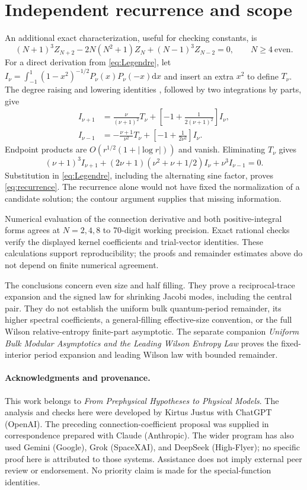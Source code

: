 \documentclass[10pt]{article}
\newcommand{\dd}{\mathrm d}
\begin{document}
\section{Independent recurrence and scope}
An additional exact characterization, useful for checking constants,
is
\begin{equation}
(N+1)^3Z_{N+2}-2N(N^2+1)Z_N+(N-1)^3Z_{N-2}=0,
\qquad N\ge4\ \text{even}.
\label{eq:recurrence}
\end{equation}
For a direct derivation from \eqref{eq:Legendre}, let
$I_\nu=\int_{-1}^1(1-x^2)^{-1/2}P_\nu(x)P_\nu(-x)\dd x$
and insert an extra $x^2$ to define $T_\nu$.
The degree raising and lowering identities \cite{dlmf}, followed
by two integrations by parts, give
\begin{align*}
I_{\nu+1}&=\frac\nu{(\nu+1)^2}T_\nu
+\left[-1+\frac1{2(\nu+1)^2}\right]I_\nu,\\
I_{\nu-1}&=-\frac{\nu+1}{\nu^2}T_\nu
+\left[-1+\frac1{2\nu^2}\right]I_\nu.
\end{align*}
Endpoint products are $O(r^{1/2}(1+|\log r|))$ and vanish.
Eliminating $T_\nu$ gives
\[
(\nu+1)^3I_{\nu+1}
+(2\nu+1)(\nu^2+\nu+1/2)I_\nu+\nu^3I_{\nu-1}=0.
\]
Substitution in \eqref{eq:Legendre}, including the alternating sine
factor, proves \eqref{eq:recurrence}. The recurrence alone would not
have fixed the normalization of a candidate solution; the contour
argument supplies that missing information.

Numerical evaluation of the connection derivative and
both positive-integral forms agrees at $N=2,4,8$ to 70-digit working
precision. Exact rational checks verify the displayed kernel
coefficients and trial-vector identities. These calculations support
reproducibility; the proofs and remainder estimates above do not
depend on finite numerical agreement.

The conclusions concern even size and half filling. They prove a
reciprocal-trace expansion and the signed law for shrinking Jacobi
modes, including the central pair. They do not establish the uniform
bulk quantum-period remainder, its higher spectral coefficients,
a general-filling effective-size convention, or the full Wilson
relative-entropy finite-part asymptotic. The separate companion \emph{Uniform Bulk Modular Asymptotics and the Leading Wilson Entropy Law} proves the fixed-interior period expansion and leading Wilson law with bounded remainder.

\paragraph{Acknowledgments and provenance.}
This work belongs to \emph{From Prephysical Hypotheses to Physical Models}.
The analysis and checks here were developed by Kirtus Justus with
ChatGPT (OpenAI). The preceding connection-coefficient proposal was
supplied in correspondence prepared with Claude (Anthropic).
The wider program has also used Gemini (Google), Grok (SpaceXAI),
and DeepSeek (High-Flyer); no specific proof here is attributed to
those systems. Assistance does not imply external peer review or
endorsement. No priority claim is made for the special-function identities.
\end{document}
